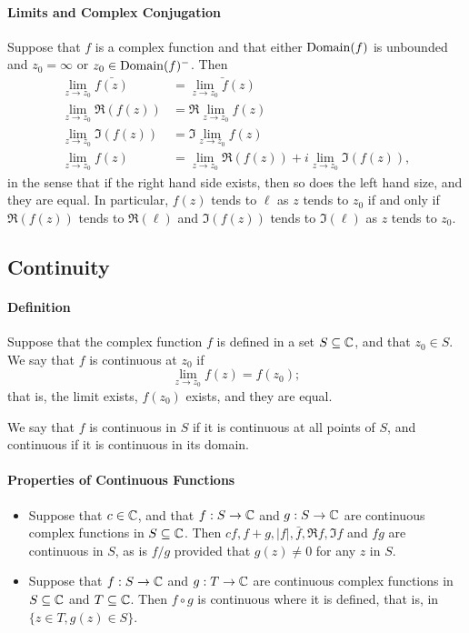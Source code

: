 \paragraph{Limits and Complex Conjugation}
Suppose that \(f\) is a complex function and that either \(\mathrm{Domain}(f)\) is unbounded and \(z_0 = \infty\) or \(z_0 \in \mathrm{Domain}(f)^-\). Then
\begin{align*}
    \lim_{z \to z_0} \bar{f(z)} & = \bar{\lim_{z \to z_0} f(z)} \\
    \lim_{z \to z_0} \Re(f(z)) & = \Re \lim_{z \to z_0} f(z) \\
    \lim_{z \to z_0} \Im(f(z)) & = \Im \lim_{z \to z_0} f(z) \\
    \lim_{z \to z_0} f(z) & = \lim_{z \to z_0} \Re(f(z)) + i \lim_{z \to z_0} \Im(f(z)),
\end{align*}
in the sense that if the right hand side exists, then so does the left hand size, and they are equal. In particular, \(f(z)\) tends to \(\ell\) as \(z\) tends to \(z_0\) if and only if \(\Re(f(z))\) tends to \(\Re(\ell)\) and \(\Im(f(z))\) tends to \(\Im(\ell)\) as \(z\) tends to \(z_0\).

\subsection{Continuity}
\paragraph{Definition}
Suppose that the complex function \(f\) is defined in a set \(S \subseteq \mathbb{C}\), and that \(z_0 \in S\). We say that \(f\) is continuous at \(z_0\) if
\[\lim_{z \to z_0} f(z) = f(z_0);\]
that is, the limit exists, \(f(z_0)\) exists, and they are equal.

We say that \(f\) is continuous in \(S\) if it is continuous at all points of \(S\), and continuous if it is continuous in its domain.

\paragraph{Properties of Continuous Functions}
\begin{itemize}
    \item Suppose that \(c \in \mathbb{C}\), and that \(f : S \to \mathbb{C}\) and \(g: S \to \mathbb{C}\) are continuous complex functions in \(S \subseteq \mathbb{C}\). Then \(cf, f + g, |f|, \bar{f}, \Re f, \Im f\) and \(fg\) are continuous in \(S\), as is \(f / g\) provided that \(g(z) \neq 0\) for any \(z\) in \(S\).
    \item Suppose that \(f: S \to \mathbb{C}\) and \(g: T \to \mathbb{C}\) are continuous complex functions in \(S \subseteq \mathbb{C}\) and \(T \subseteq \mathbb{C}\). Then \(f \circ g\) is continuous where it is defined, that is, in \(\{z \in T, g(z) \in S \}\).
\end{itemize}


